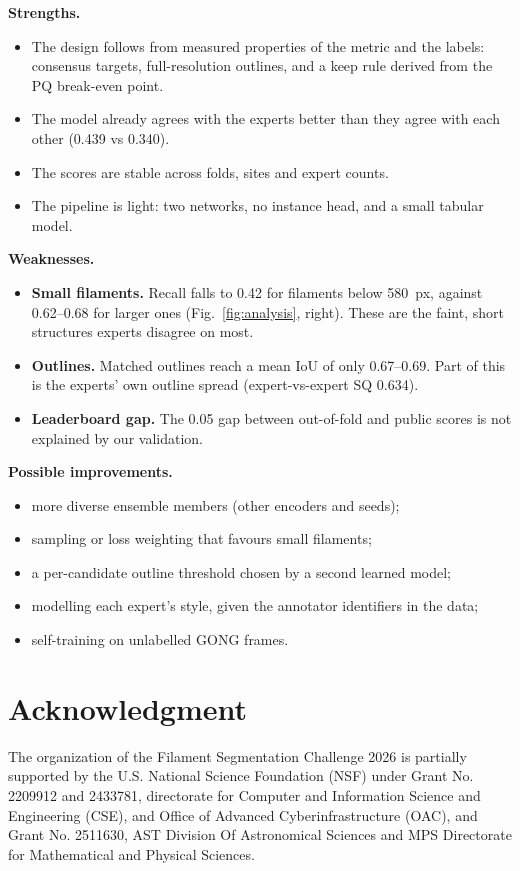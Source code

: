 \documentclass[sigconf]{acmart}
\begin{document}
\textbf{Strengths.}
\begin{itemize}
    \item The design follows from measured properties of the metric and the labels: consensus targets, full-resolution outlines, and a keep rule derived from the PQ break-even point.
    \item The model already agrees with the experts better than they agree with each other (0.439 vs 0.340).
    \item The scores are stable across folds, sites and expert counts.
    \item The pipeline is light: two networks, no instance head, and a small tabular model.
\end{itemize}

\textbf{Weaknesses.}
\begin{itemize}
    \item \textbf{Small filaments.} Recall falls to 0.42 for filaments below 580~px, against 0.62--0.68 for larger ones (Fig.~\ref{fig:analysis}, right). These are the faint, short structures experts disagree on most.
    \item \textbf{Outlines.} Matched outlines reach a mean IoU of only 0.67--0.69. Part of this is the experts' own outline spread (expert-vs-expert SQ 0.634).
    \item \textbf{Leaderboard gap.} The 0.05 gap between out-of-fold and public scores is not explained by our validation.
\end{itemize}

\textbf{Possible improvements.}
\begin{itemize}
    \item more diverse ensemble members (other encoders and seeds);
    \item sampling or loss weighting that favours small filaments;
    \item a per-candidate outline threshold chosen by a second learned model;
    \item modelling each expert's style, given the annotator identifiers in the data;
    \item self-training on unlabelled GONG frames.
\end{itemize}

\section{Acknowledgment}\label{sec:acknowledgment}
    The organization of the Filament Segmentation Challenge 2026 is partially supported by the U.S. National Science Foundation (NSF) under Grant No. 2209912 and 2433781, directorate for Computer and Information Science and Engineering (CSE), and Office of Advanced Cyberinfrastructure (OAC), and Grant No. 2511630, AST Division Of Astronomical Sciences and MPS Directorate for Mathematical and Physical Sciences.
\end{document}
